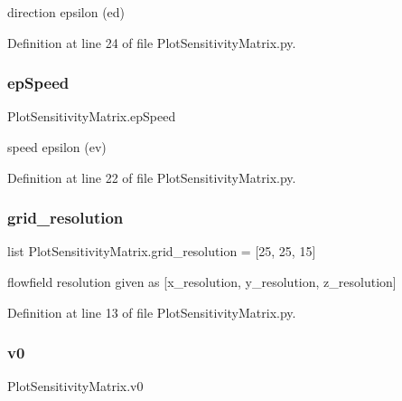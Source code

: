 direction epsilon (ed) 



Definition at line 24 of file Plot\+Sensitivity\+Matrix.\+py.

\mbox{\label{namespace_plot_sensitivity_matrix_ab31b859e626585979a4ba8ba3c6f6c25}} 
\subsubsection{\texorpdfstring{ep\+Speed}{epSpeed}}
{\footnotesize\ttfamily Plot\+Sensitivity\+Matrix.\+ep\+Speed}



speed epsilon (ev) 



Definition at line 22 of file Plot\+Sensitivity\+Matrix.\+py.

\mbox{\label{namespace_plot_sensitivity_matrix_acceedf9e01ea99cebd60321cfe5f1563}} 
\subsubsection{\texorpdfstring{grid\+\_\+resolution}{grid\_resolution}}
{\footnotesize\ttfamily list Plot\+Sensitivity\+Matrix.\+grid\+\_\+resolution = \mbox{[}25, 25, 15\mbox{]}}



flowfield resolution given as \mbox{[}x\+\_\+resolution, y\+\_\+resolution, z\+\_\+resolution\mbox{]} 



Definition at line 13 of file Plot\+Sensitivity\+Matrix.\+py.

\mbox{\label{namespace_plot_sensitivity_matrix_a9c4c4d6959315c8f430d5e0b4b59945d}} 
\subsubsection{\texorpdfstring{v0}{v0}}
{\footnotesize\ttfamily Plot\+Sensitivity\+Matrix.\+v0}



